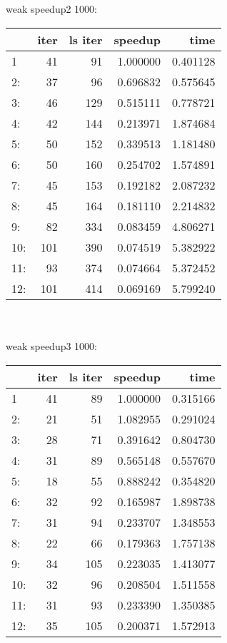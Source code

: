 \documentclass[11pt,a4paper]{article}
\begin{document}
\\ 
\\ 
 weak speedup2 1000:
\\ 
\begin{tabular}{lrrrr}
\toprule
{} &  iter &  ls iter &   speedup &      time \\
\midrule
1   &    41 &       91 &  1.000000 &  0.401128 \\
2:  &    37 &       96 &  0.696832 &  0.575645 \\
3:  &    46 &      129 &  0.515111 &  0.778721 \\
4:  &    42 &      144 &  0.213971 &  1.874684 \\
5:  &    50 &      152 &  0.339513 &  1.181480 \\
6:  &    50 &      160 &  0.254702 &  1.574891 \\
7:  &    45 &      153 &  0.192182 &  2.087232 \\
8:  &    45 &      164 &  0.181110 &  2.214832 \\
9:  &    82 &      334 &  0.083459 &  4.806271 \\
10: &   101 &      390 &  0.074519 &  5.382922 \\
11: &    93 &      374 &  0.074664 &  5.372452 \\
12: &   101 &      414 &  0.069169 &  5.799240 \\
\bottomrule
\end{tabular}
\\ 
\\ 
 weak speedup3 1000:
\\ 
\begin{tabular}{lrrrr}
\toprule
{} &  iter &  ls iter &   speedup &      time \\
\midrule
1   &    41 &       89 &  1.000000 &  0.315166 \\
2:  &    21 &       51 &  1.082955 &  0.291024 \\
3:  &    28 &       71 &  0.391642 &  0.804730 \\
4:  &    31 &       89 &  0.565148 &  0.557670 \\
5:  &    18 &       55 &  0.888242 &  0.354820 \\
6:  &    32 &       92 &  0.165987 &  1.898738 \\
7:  &    31 &       94 &  0.233707 &  1.348553 \\
8:  &    22 &       66 &  0.179363 &  1.757138 \\
9:  &    34 &      105 &  0.223035 &  1.413077 \\
10: &    32 &       96 &  0.208504 &  1.511558 \\
11: &    31 &       93 &  0.233390 &  1.350385 \\
12: &    35 &      105 &  0.200371 &  1.572913 \\
\bottomrule
\end{tabular}
\end{document}
